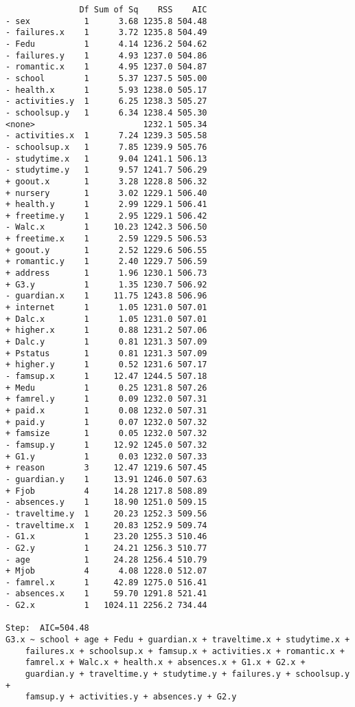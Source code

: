 \documentclass[11pt]{article}
\begin{document}
\begin{enumerate}
\begin{verbatim}
               Df Sum of Sq    RSS    AIC
- sex           1      3.68 1235.8 504.48
- failures.x    1      3.72 1235.8 504.49
- Fedu          1      4.14 1236.2 504.62
- failures.y    1      4.93 1237.0 504.86
- romantic.x    1      4.95 1237.0 504.87
- school        1      5.37 1237.5 505.00
- health.x      1      5.93 1238.0 505.17
- activities.y  1      6.25 1238.3 505.27
- schoolsup.y   1      6.34 1238.4 505.30
<none>                      1232.1 505.34
- activities.x  1      7.24 1239.3 505.58
- schoolsup.x   1      7.85 1239.9 505.76
- studytime.x   1      9.04 1241.1 506.13
- studytime.y   1      9.57 1241.7 506.29
+ goout.x       1      3.28 1228.8 506.32
+ nursery       1      3.02 1229.1 506.40
+ health.y      1      2.99 1229.1 506.41
+ freetime.y    1      2.95 1229.1 506.42
- Walc.x        1     10.23 1242.3 506.50
+ freetime.x    1      2.59 1229.5 506.53
+ goout.y       1      2.52 1229.6 506.55
+ romantic.y    1      2.40 1229.7 506.59
+ address       1      1.96 1230.1 506.73
+ G3.y          1      1.35 1230.7 506.92
- guardian.x    1     11.75 1243.8 506.96
+ internet      1      1.05 1231.0 507.01
+ Dalc.x        1      1.05 1231.0 507.01
+ higher.x      1      0.88 1231.2 507.06
+ Dalc.y        1      0.81 1231.3 507.09
+ Pstatus       1      0.81 1231.3 507.09
+ higher.y      1      0.52 1231.6 507.17
- famsup.x      1     12.47 1244.5 507.18
+ Medu          1      0.25 1231.8 507.26
+ famrel.y      1      0.09 1232.0 507.31
+ paid.x        1      0.08 1232.0 507.31
+ paid.y        1      0.07 1232.0 507.32
+ famsize       1      0.05 1232.0 507.32
- famsup.y      1     12.92 1245.0 507.32
+ G1.y          1      0.03 1232.0 507.33
+ reason        3     12.47 1219.6 507.45
- guardian.y    1     13.91 1246.0 507.63
+ Fjob          4     14.28 1217.8 508.89
- absences.y    1     18.90 1251.0 509.15
- traveltime.y  1     20.23 1252.3 509.56
- traveltime.x  1     20.83 1252.9 509.74
- G1.x          1     23.20 1255.3 510.46
- G2.y          1     24.21 1256.3 510.77
- age           1     24.28 1256.4 510.79
+ Mjob          4      4.08 1228.0 512.07
- famrel.x      1     42.89 1275.0 516.41
- absences.x    1     59.70 1291.8 521.41
- G2.x          1   1024.11 2256.2 734.44

Step:  AIC=504.48
G3.x ~ school + age + Fedu + guardian.x + traveltime.x + studytime.x + 
    failures.x + schoolsup.x + famsup.x + activities.x + romantic.x + 
    famrel.x + Walc.x + health.x + absences.x + G1.x + G2.x + 
    guardian.y + traveltime.y + studytime.y + failures.y + schoolsup.y + 
    famsup.y + activities.y + absences.y + G2.y


\end{verbatim}
\end{enumerate}
\end{document}
